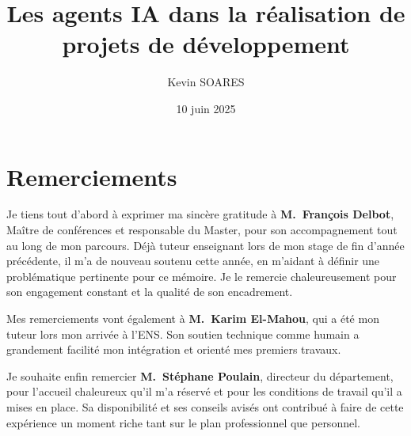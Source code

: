\documentclass[a4paper, 12pt, twoside]{report}
\begin{document}


\author{Kevin SOARES}
\title{Les agents IA dans la réalisation de projets  de développement}

\date{10 juin 2025}


\pagedegarde



\chapter*{Remerciements}

Je tiens tout d’abord à exprimer ma sincère gratitude à \textbf{M.~François Delbot}, Maître de conférences et responsable du Master, pour son accompagnement tout au long de mon parcours. Déjà tuteur enseignant lors de mon stage de fin d’année précédente, il m’a de nouveau soutenu cette année, en m’aidant à définir une problématique pertinente pour ce mémoire. Je le remercie chaleureusement pour son engagement constant et la qualité de son encadrement.

Mes remerciements vont également à \textbf{M.~Karim El-Mahou}, qui a été mon tuteur lors mon arrivée à l’ENS. Son soutien technique comme humain a grandement facilité mon intégration et orienté mes premiers travaux.

Je souhaite enfin remercier \textbf{M.~Stéphane Poulain}, directeur du département, pour l’accueil chaleureux qu’il m’a réservé et pour les conditions de travail qu’il a mises en place. Sa disponibilité et ses conseils avisés ont contribué à faire de cette expérience un moment riche tant sur le plan professionnel que personnel.





\end{document}
